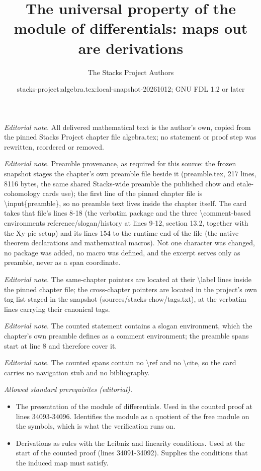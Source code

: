 \documentclass[10pt,a4paper]{amsart}
\title{The universal property of the module of differentials: maps out are derivations}
\author{The Stacks Project Authors}
\date{stacks-project:algebra.tex:local-snapshot-20261012; GNU FDL 1.2 or later}
\theoremstyle{plain}
\theoremstyle{definition}
\theoremstyle{remark}
\numberwithin{equation}{subsection}
\begin{document}
\maketitle
\noindent\textit{Editorial note.} All delivered mathematical text is the author's own, copied from the pinned Stacks Project chapter file algebra.tex; no statement or proof step was rewritten, reordered or removed.\par\medskip
\noindent\textit{Editorial note.} Preamble provenance, as required for this source: the frozen snapshot stages the chapter's own preamble file beside it (preamble.tex, 217 lines, 8116 bytes, the same shared Stacks-wide preamble the published chow and etale-cohomology cards use); the first line of the pinned chapter file is \textbackslash{}input\{preamble\}, so no preamble text lives inside the chapter itself. The card takes that file's lines 8-18 (the verbatim package and the three \textbackslash{}comment-based environments reference/slogan/history at lines 9-12, section 13.2, together with the Xy-pic setup) and its lines 154 to the runtime end of the file (the native theorem declarations and mathematical macros). Not one character was changed, no package was added, no macro was defined, and the excerpt serves only as preamble, never as a span coordinate.\par\medskip
\noindent\textit{Editorial note.} The same-chapter pointers are located at their \textbackslash{}label lines inside the pinned chapter file; the cross-chapter pointers are located in the project's own tag list staged in the snapshot (sources/stacks-chow/tags.txt), at the verbatim lines carrying their canonical tags.\par\medskip
\noindent\textit{Editorial note.} The counted statement contains a slogan environment, which the chapter's own preamble defines as a comment environment; the preamble spans start at line 8 and therefore cover it.\par\medskip
\noindent\textit{Editorial note.} The counted spans contain no \textbackslash{}ref and no \textbackslash{}cite, so the card carries no navigation stub and no bibliography.\par\medskip
\noindent\textit{Allowed standard prerequisites (editorial).}\begin{itemize}
\item The presentation of the module of differentials. Used in the counted proof at lines 34093-34096. Identifies the module as a quotient of the free module on the symbols, which is what the verification runs on.
\item Derivations as rules with the Leibniz and linearity conditions. Used at the start of the counted proof (lines 34091-34092). Supplies the conditions that the induced map must satisfy.
\end{itemize}\medskip
\end{document}
